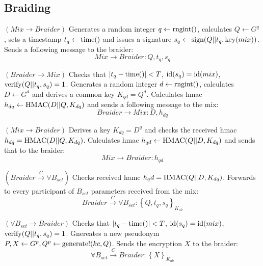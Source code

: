 \documentclass[12pt]{article}
\begin{document}
\subsection*{Braiding}

\begin{steps}
\item $(Mix \to Braider)$ Generates a random integer $q \leftarrow {\rm rngint}()$, calculates $Q \leftarrow G^q$, sets a timestamp $t_q \leftarrow {\rm time}()$ and issues a signature $s_q \leftarrow {\rm sign}(Q||t_q, {\rm key}(mix))$. Sends a following message to the braider:
  \begin{equation}
    Mix \to Braider: Q, t_q, s_q
  \end{equation}
\item $(Braider \to Mix)$ Checks that $|t_q - {\rm time}()|<T$, ${\rm id}(s_q)={\rm id}(mix)$, ${\rm verify}(Q||t_q, s_q) = 1$. Generates a random integer $d \leftarrow {\rm rngint}()$, calculates $D \leftarrow G^d$ and derives a common key $K_{qd} = Q^d$. Calculates hmac $h_{dq} \leftarrow {\rm HMAC}(D||Q,K_{dq})$ and sends a following message to the mix:
  \begin{equation}
    Braider \to Mix: D, h_{dq}
  \end{equation}
\item $(Mix \to Braider)$ Derives a key $K_{dq}=D^q$ and checks the received hmac $h_{dq} = {\rm HMAC}(D||Q,K_{dq})$. Calculates hmac $h_{qd} \leftarrow {\rm HMAC}(Q||D,K_{dq})$ and sends that to the braider:
  \begin{equation}
    Mix \to Braider: h_{qd}
  \end{equation}
\item $(Braider \overset{C}{\to} \forall B_{set})$ Checks received hamc $h_qd = {\rm HMAC}(Q||D,K_{dq})$. Forwards to every participant of $B_{set}$ parameters received from the mix:
  \begin{equation}
    Braider \overset{C}{\to} \forall B_{set}: \left\{ Q, t_q, s_q \right\}_{K_{ab}}
  \end{equation}
  
\item $(\forall B_{set} \to Braider)$ Checks that $|t_q - {\rm time}()|<T$, ${\rm id}(s_q)={\rm id}(mix)$, ${\rm verify}(Q||t_q, s_q) = 1$. Gnereates a new pseudonym $P,X \leftarrow G^p, Q^p \leftarrow {\rm generate!}(kc, Q)$. Sends the encryption $X$ to the braider:
  \begin{equation}
    \forall B_{set} \overset{C}{\to} Braider: \left\{ X \right\}_{K_{ab}}
  \end{equation}
  

\end{steps}
\end{document}
